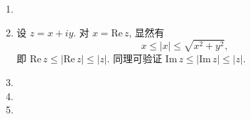 \documentclass[a4paper, 11pt]{ctexart}
\newcommand{\re}{\mathrm{Re}\,}
\newcommand{\im}{\mathrm{Im}\,}
\begin{document}
\pagestyle{empty}
\begin{enumerate}
    \item %
    \item %
        设 $z = x + iy$. 对 $x = \re z$, 显然有
        \[
            x \leqslant |x| \leqslant \sqrt{x^2 + y^2},    
        \]
        即 $\re z \leqslant |\re z| \leqslant |z|$. 同理可验证 $\im z \leqslant |\im z| \leqslant |z|$.
    \item %
    \item %
    \item %
\end{enumerate}
\end{document}
